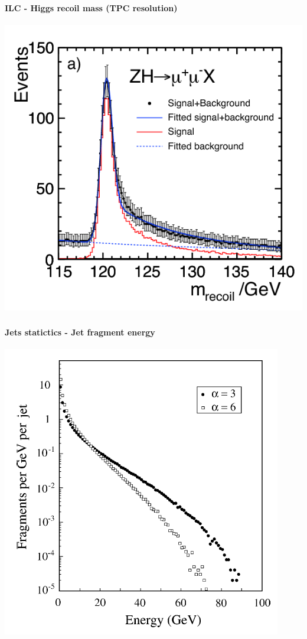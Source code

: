 \documentclass[8pt]{beamer}
\begin{document}
  \begin{frame}
  \frametitle{\backup}
  \framesubtitle{ILC - Higgs recoil mass (TPC resolution) }
    \begin{center}
      \includegraphics[width=0.7\linewidth]{RecoilMass_mmX.png}
    \end{center}
  \end{frame}

  \begin{frame}
  \frametitle{\backup}
  \framesubtitle{Jets statictics - Jet fragment energy}
    \begin{center}
      \includegraphics[width=0.7\linewidth]{jet_fragment_energy.png}
    \end{center}
  \end{frame}
\end{document}
